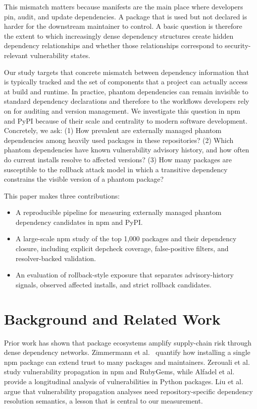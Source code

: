 \documentclass[letterpaper,twocolumn,10pt]{article}
\newcommand{\npm}{npm\xspace}
\newcommand{\pypi}{PyPI\xspace}
\begin{document}
This mismatch matters because manifests are the main place where developers
pin, audit, and update dependencies.  A package that is used but not declared is
harder for the downstream maintainer to control.  A basic question is therefore
the extent to which increasingly dense dependency structures create hidden
dependency relationships and whether those relationships correspond to
security-relevant vulnerability states.

Our study targets that concrete mismatch between dependency information that is
typically tracked and the set of components that a project can actually access
at build and runtime.  In practice, phantom dependencies can remain invisible to
standard dependency declarations and therefore to the workflows developers rely
on for auditing and version management.  We investigate this question in \npm
and \pypi because of their scale and centrality to modern software development.
Concretely, we ask: (1) How prevalent are externally managed phantom
dependencies among heavily used packages in these repositories? (2) Which
phantom dependencies have known vulnerability advisory history, and how often
do current installs resolve to affected versions? (3) How many packages are
susceptible to the rollback attack model in which a transitive dependency
constrains the visible version of a phantom package?

This paper makes three contributions:
\begin{itemize}[leftmargin=*]
  \item A reproducible pipeline for measuring externally managed phantom
  dependency candidates in \npm and \pypi.
  \item A large-scale \npm study of the top 1,000 packages and their dependency
  closure, including explicit depcheck coverage, false-positive filters, and
  resolver-backed validation.
  \item An evaluation of rollback-style exposure that separates advisory-history
  signals, observed affected installs, and strict rollback candidates.
\end{itemize}

\section{Background and Related Work}

Prior work has shown that package ecosystems amplify supply-chain risk through
dense dependency networks.  Zimmermann et al.~\cite{zimmermann2019smallworld}
quantify how installing a single \npm package can extend trust to many packages
and maintainers.  Zerouali et al.~\cite{zerouali2022impact} study vulnerability
propagation in \npm and RubyGems, while Alfadel et al.~\cite{alfadel2023python}
provide a longitudinal analysis of vulnerabilities in Python packages.  Liu et
al.~\cite{liu2022dependencytrees} argue that vulnerability propagation analyses
need repository-specific dependency resolution semantics, a lesson that is
central to our measurement.
\end{document}
